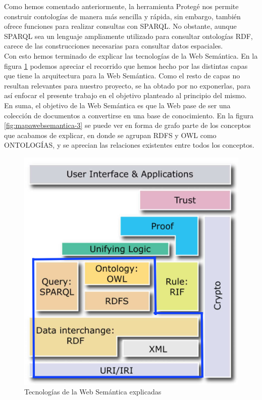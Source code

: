 Como hemos comentado anteriormente, la herramienta Protegé nos permite construir contologías de manera más sencilla y rápida, sin embargo, también ofrece funciones para realizar consultas con SPARQL. No obstante, aunque SPARQL sea un lenguaje ampliamente utilizado para consultar ontologías RDF, carece de las construcciones necesarias para consultar datos espaciales.\\ %

 Con esto hemos terminado de explicar las tecnologías de la Web Semántica. En la figura \ref{fig:arquitectura2copia} podemos apreciar el recorrido que hemos hecho por las distintas capas que tiene la arquitectura para la Web Semántica. Como el resto de capas no resultan relevantes para nuestro proyecto, se ha obtado por no exponerlas, para así enfocar el presente trabajo en el objetivo planteado al principio del mismo.\\
 
 En suma, el objetivo de la Web Semántica es que la Web pase de ser una colección de documentos a convertirse en una base de conocimiento. En la figura \ref{fig:mapawebsemantica-3} se puede ver en forma de grafo parte de los conceptos que acabamos de explicar, en donde se agrupan RDFS y OWL como ONTOLOGÍAS, y se aprecian las relaciones existentes entre todos los conceptos.

\begin{figure}[H]
	\centering
	\includegraphics[width=0.5\linewidth]{imagenes/capitulo3/arquitectura2copia}
	\caption{Tecnologías de la Web Semántica explicadas \cite{apuntes-clase-jose}}
	\label{fig:arquitectura2copia}
\end{figure}


